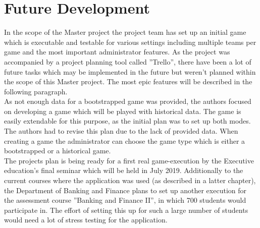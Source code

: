 \section{Future Development}
In the scope of the Master project the project team has set up an initial game which is executable and testable for various settings including multiple teams per game and the most important administrator features. As the project was accompanied by a project planning tool called ''Trello'', there have been a lot of future tasks which may be implemented in the future but weren't planned within the scope of this Master project. The most epic features will be described in the following paragraph. \\

As not enough data for a bootstrapped game was provided, the authors focused on developing a game which will be played with historical data. The game is easily extendable for this purpose, as the initial plan was to set up both modes. The authors had to revise this plan due to the lack of provided data. When creating a game the administrator can choose the game type which is either a bootstrapped or a historical game. \\


The projects plan is being ready for a first real game-execution by the Executive education's final seminar which will be held in July 2019. Additionally to the current courses where the application was used (as described in a latter chapter), the Department of Banking and Finance plans to set up another execution for the assessment course ''Banking and Finance II'', in which 700 students would participate in. The effort of setting this up for such a large number of students would need a lot of stress testing for the application.
